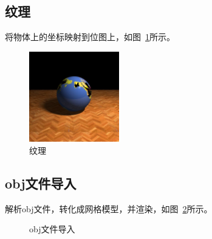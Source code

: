 \documentclass{article}
\begin{document}
\subsection{纹理}
将物体上的坐标映射到位图上，如图~\ref{fig:texture}所示。
\begin{figure}[H]
  \centering%
  \includegraphics[width=0.35\textwidth]{10.jpg}
  \caption{纹理}
  \label{fig:texture}
\end{figure}

\subsection{obj文件导入}
解析obj文件，转化成网格模型，并渲染，如图~\ref{fig:obj}所示。
\begin{figure}[H]
  \centering%
  \caption{obj文件导入}
  \label{fig:obj}
\end{figure}
\end{document}
